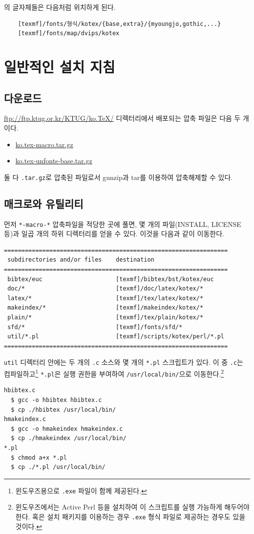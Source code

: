 \kotex 의 글자체들은 다음처럼 위치하게 된다.
\begin{verbatim}
    [texmf]/fonts/형식/kotex/{base,extra}/{myoungjo,gothic,...}
    [texmf]/fonts/map/dvips/kotex
\end{verbatim}


\section{일반적인 설치 지침}

\subsection{다운로드}\label{sec:download}

\url{ftp://ftp.ktug.or.kr/KTUG/ko.TeX/} 디렉터리에서 배포되는
압축 파일은 다음 두 개이다.
\begin{itemize}
\item \href{http://ftp.ktug.or.kr/KTUG/ko.tex/ko.tex-macro.tar.gz}{ko.tex-macro.tar.gz}
\item \href{http://ftp.ktug.or.kr/KTUG/ko.tex/ko.tex-unfonts-base.tar.gz}{ko.tex-unfonts-base.tar.gz}
\end{itemize}
둘 다 \texttt{.tar.gz}로 압축된 파일로서 gunzip과 tar를 이용하여
압축해제할 수 있다. 

\subsection{매크로와 유틸리티}
먼저 \texttt{*-macro-*} 압축파일을 적당한 곳에 풀면, 몇 개의 파일(INSTALL,
LICENSE 등)과 일곱 개의 하위 디렉터리를 얻을 수 있다. 이것을 다음과 같이
이동한다.
\begin{verbatim}
================================================================
 subdirectories and/or files    destination
================================================================
 bibtex/euc                     [texmf]/bibtex/bst/kotex/euc
 doc/*                          [texmf]/doc/latex/kotex/*
 latex/*                        [texmf]/tex/latex/kotex/*
 makeindex/*                    [texmf]/makeindex/kotex/*
 plain/*                        [texmf]/tex/plain/kotex/*
 sfd/*                          [texmf]/fonts/sfd/*
 util/*.pl                      [texmf]/scripts/kotex/perl/*.pl
================================================================
\end{verbatim}

\texttt{util} 디렉터리 안에는 두 개의 \texttt{.c} 소스와 몇 개의
\texttt{*.pl} 스크립트가 있다. 이 중 \texttt{.c}는 컴파일하고\footnote{%
  윈도우즈용으로 \texttt{.exe} 파일이 함께 제공된다.}
\texttt{*.pl}은 실행 권한을 부여하여 \texttt{/usr/local/bin/}으로
이동한다.\footnote{%
  윈도우즈에서는 Active Perl 등을 설치하여 이 스크립트를 실행 가능하게 
  해두어야 한다. 혹은 설치 패키지를 이용하는 경우 \texttt{.exe} 형식
  파일로 제공하는 경우도 있을 것이다.}
\begin{verbatim}
hbibtex.c
  $ gcc -o hbibtex hbibtex.c
  $ cp ./hbibtex /usr/local/bin/
hmakeindex.c
  $ gcc -o hmakeindex hmakeindex.c
  $ cp ./hmakeindex /usr/local/bin/
*.pl
  $ chmod a+x *.pl
  $ cp ./*.pl /usr/local/bin/
\end{verbatim}


